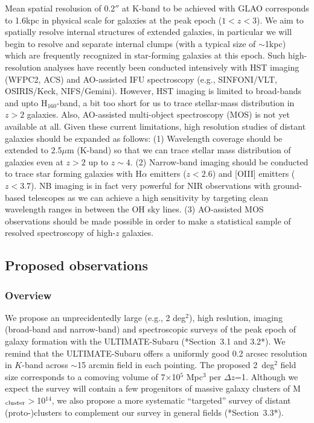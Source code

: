 Mean spatial resolusion of 0.2$''$ at K-band to be achieved with GLAO
corresponds to 1.6kpc in physical scale for galaxies at the peak epoch
($1<z<3$). We aim to spatially resolve internal structures of extended
galaxies, in particular we will begin to resolve and separate internal
clumps (with a typical size of $\sim$1kpc) 
which are frequently recognized in star-forming galaxies at this epoch.
Such high-resolution analyses have recently been conducted intensively
with HST imaging (WFPC2, ACS) and AO-assisted IFU spectroscopy 
(e.g., SINFONI/VLT, OSIRIS/Keck, NIFS/Gemini).
However, HST imaging is limited to broad-bands and upto H$_{160}$-band,
a bit too short for us to trace stellar-mass distribution in $z>2$
galaxies. Also, AO-assisted multi-object spectroscopy (MOS) is not yet
available at all. Given these current limitations, high resolution
studies of distant galaxies should be expanded as follows: 
(1) Wavelength coverage should be extended to 2.5$\mu$m (K-band) so that 
we can trace stellar mass distribution of galaxies even at $z>2$ up to
$z\sim4$. 
(2) Narrow-band imaging should be conducted to trace star forming
galaxies with H$\alpha$ emitters ($z<2.6$) and [OIII] emitters
($z<3.7$). NB imaging is in fact very powerful for NIR observations with
ground-based telescopes as we can achieve a high sensitivity by
targeting clean wavelength ranges in between the OH sky lines.
(3) AO-assisted MOS observations should be made possible in order to make
a statistical sample of resolved spectroscopy of high-$z$ galaxies.

\subsection{Proposed observations}

\subsubsection{Overview}

We propose an unprecidentedly large (e.g., 2 deg$^2$), high reslution, imaging 
(broad-band and narrow-band) and spectroscopic surveys of the peak epoch of galaxy 
formation with the ULTIMATE-Subaru (*Section~3.1 and 3.2*). We remind that the 
ULTIMATE-Subaru offers a uniformly good 0.2 arcsec resolution in $K$-band across 
$\sim$15 arcmin field in each pointing. The proposed 2~deg$^2$ field size corresponds
to a comoving volume of 7$\times$10$^5$ Mpc$^3$ per $\Delta$$z$=1. 
Although we expect the survey will contain a few progenitors of massive galaxy 
clusters of M$_{\rm cluster}$$>$10$^{14}$\msun, 
we also propose a more systematic ``targeted'' survey of distant
(proto-)clusters to complement our survey in general fields
(*Section~3.3*).  

